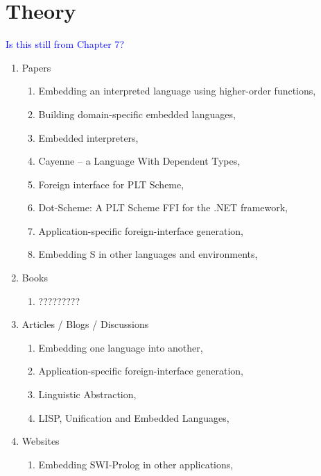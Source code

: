 \documentclass[thesis-solanki.tex]{subfiles}
\begin{document}
\section{Theory}
\textcolor{blue}{Is this still from Chapter 7?}
\begin{enumerate}
\item Papers
\begin{enumerate}
\item Embedding an interpreted language using higher-order functions, \cite{ramsey2003embedding}
\item Building domain-specific embedded languages, \cite{hudak1996building}
\item Embedded interpreters, \cite{benton2005embedded}
\item Cayenne -- a Language With Dependent Types, \cite{Augustsson98cayenne--}
\item Foreign interface for PLT Scheme, \cite{barzilay2004foreign}
\item Dot-Scheme: A PLT Scheme FFI for the .NET framework, \cite{pinto2003dot}
\item Application-specific foreign-interface generation, \cite{reppy2006application}
\item Embedding S in other languages and environments, \cite{lang2001embedding}
\end{enumerate}
\item Books
\begin{enumerate}
\item ?????????
\end{enumerate}
\item Articles / Blogs / Discussions
\begin{enumerate}
\item Embedding one language into another, \cite{website:lambda-the-ultimate-2}
\item Application-specific foreign-interface generation, \cite{website:lambda-the-ultimate-3}
\item Linguistic Abstraction, \cite{audklangembedd}
\item LISP, Unification and Embedded Languages, \cite{ummlisp}
\end{enumerate}
\item Websites
\begin{enumerate}
\item Embedding SWI-Prolog in other applications, \cite{swipembedd}
\end{enumerate}
\end{enumerate}
\end{document}
